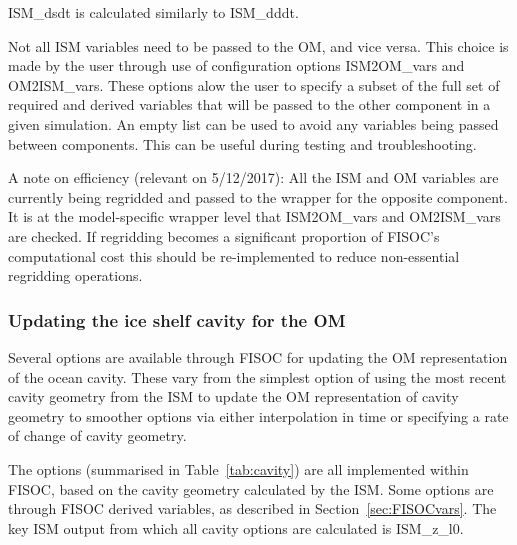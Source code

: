 \documentclass[12pt]{article}
\begin{document}
ISM\_dsdt is calculated similarly to ISM\_dddt.

Not all ISM variables need to be passed to the OM, and vice versa.  
This choice is made by the 
user through use of configuration options ISM2OM\_vars and OM2ISM\_vars.  
These options alow the user to specify a subset of the full set of 
required and derived variables that will be passed to the other component 
in a given simulation.  An empty list can be used to avoid any variables 
being passed between components.  This can be useful during testing and 
troubleshooting.

A note on efficiency (relevant on 5/12/2017): 
All the ISM and OM variables are currently being regridded and passed 
to the wrapper for the opposite component.  It is at the model-specific 
wrapper level that ISM2OM\_vars and OM2ISM\_vars are checked.  If regridding 
becomes a significant proportion of FISOC's computational cost this 
should be re-implemented to reduce non-essential regridding operations.





\subsubsection{Updating the ice shelf cavity for the OM}

Several options are available through FISOC for updating the OM representation 
of the ocean cavity. 
These vary from the simplest option of using 
the most recent cavity geometry from the ISM to update the OM representation of 
cavity geometry to smoother options via either interpolation in time or 
specifying a rate of change of cavity geometry.

The options (summarised in Table~\ref{tab:cavity}) are all implemented 
within FISOC, based on the cavity geometry 
calculated by the ISM.  
Some options are through FISOC derived variables, as described 
in Section~\ref{sec:FISOCvars}.  
The key ISM output from which all cavity options 
are calculated is ISM\_z\_l0.  
\end{document}
